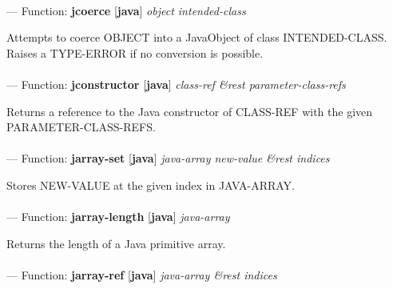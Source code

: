 \paragraph{}
\label{JAVA:JCOERCE}
--- Function: \textbf{jcoerce} [\textbf{java}] \textit{object intended-class}

\begin{adjustwidth}{5em}{5em}
Attempts to coerce OBJECT into a JavaObject of class INTENDED-CLASS.  Raises a TYPE-ERROR if no conversion is possible.
\end{adjustwidth}

\paragraph{}
\label{JAVA:JCONSTRUCTOR}
--- Function: \textbf{jconstructor} [\textbf{java}] \textit{class-ref \&rest parameter-class-refs}

\begin{adjustwidth}{5em}{5em}
Returns a reference to the Java constructor of CLASS-REF with the given PARAMETER-CLASS-REFS.
\end{adjustwidth}

\paragraph{}
\label{JAVA:JARRAY-SET}
--- Function: \textbf{jarray-set} [\textbf{java}] \textit{java-array new-value \&rest indices}

\begin{adjustwidth}{5em}{5em}
Stores NEW-VALUE at the given index in JAVA-ARRAY.
\end{adjustwidth}

\paragraph{}
\label{JAVA:JARRAY-LENGTH}
--- Function: \textbf{jarray-length} [\textbf{java}] \textit{java-array}

\begin{adjustwidth}{5em}{5em}
Returns the length of a Java primitive array.
\end{adjustwidth}

\paragraph{}
\label{JAVA:JARRAY-REF}
--- Function: \textbf{jarray-ref} [\textbf{java}] \textit{java-array \&rest indices}

